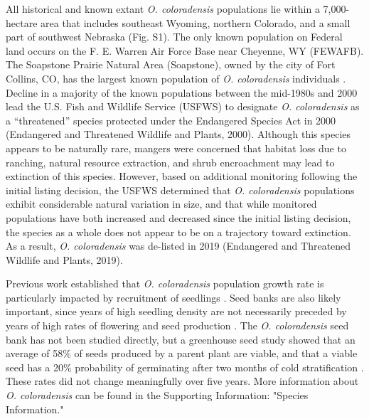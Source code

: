 \documentclass[12pt, letterpaper]{article}
\begin{document}
All historical and known extant \textit{O. coloradensis} populations lie within a 7,000-hectare area that includes southeast Wyoming, northern Colorado, and a small part of southwest Nebraska (Fig. S1). The only known population on Federal land occurs on the F. E. Warren Air Force Base near Cheyenne, WY (FEWAFB). The Soapstone Prairie Natural Area (Soapstone), owned by the city of Fort Collins, CO, has the largest known population of \textit{O. coloradensis} individuals \cite{Heidel202133-YearWyoming}. Decline in a majority of the known populations between the mid-1980s and 2000 lead the U.S. Fish and Wildlife Service (USFWS) to designate \textit{O. coloradensis} as a “threatened” species protected under the Endangered Species Act in 2000 (Endangered and Threatened Wildlife and Plants, 2000). Although this species appears to be naturally rare, mangers were concerned that habitat loss due to ranching, natural resource extraction, and shrub encroachment may lead to extinction of this species. However, based on additional monitoring following the initial listing decision, the USFWS determined that \textit{O. coloradensis} populations exhibit considerable natural variation in size, and that while monitored populations have both increased and decreased since the initial listing decision, the species as a whole does not appear to be on a trajectory toward extinction. As a result, \textit{O. coloradensis} was de-listed in 2019 (Endangered and Threatened Wildlife and Plants, 2019).
\nocite{USFWS2019}
\nocite{USFWS2000}

Previous work established that \textit{O. coloradensis} population growth rate is particularly impacted by recruitment of seedlings \cite{Floyd1998}. Seed banks are also likely important, since years of high seedling density are not necessarily preceded by years of high rates of flowering and seed production \cite{Munk2002RosetteSpecies, Heidel202133-YearWyoming}. The \textit{O. coloradensis} seed bank has not been studied directly, but a greenhouse seed study showed that an average of 58\% of seeds produced by a parent plant are viable, and that a viable seed has a 20\% probability of germinating after two months of cold stratification \cite{Burgess2005CapsuleColoradensis}. These rates did not change meaningfully over five years. More information about \textit{O. coloradensis} can be found in the Supporting Information: "Species Information."
\end{document}
